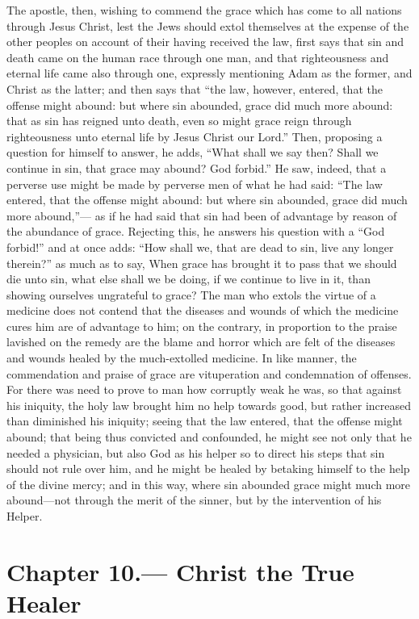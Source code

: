 \documentclass[10pt, twocolumn, oneside, a4paper]{memoir}
\newcommand{\gloss}[1]{%
    \marginpar[\RaggedLeft \footnotesize{#1}]{\RaggedRight \footnotesize{#1}}}
\begin{document}
The apostle, then, wishing to commend the grace which has come to all nations through Jesus Christ, lest the Jews should extol themselves at the expense of the other peoples on account of their having received the law, first says that sin and death came on the human race through one man, and that righteousness and eternal life came also through one, expressly mentioning Adam as the former, and Christ as the latter; and then says that ``the law, however, entered, that the offense might abound: but where sin abounded, grace did much more abound: that as sin has reigned unto death, even so might grace reign through righteousness unto eternal life by Jesus Christ our Lord.'' \gloss{Romans 5:20-21} Then, proposing a question for himself to answer, he adds, ``What shall we say then? Shall we continue in sin, that grace may abound? God forbid.''  He saw, indeed, that a perverse use might be made by perverse men of what he had said: ``The law entered, that the offense might abound: but where sin abounded, grace did much more abound,''— as if he had said that sin had been of advantage by reason of the abundance of grace. Rejecting this, he answers his question with a ``God forbid!'' and at once adds: ``How shall we, that are dead to sin, live any longer therein?'' \gloss{Romans 6:2} as much as to say, When grace has brought it to pass that we should die unto sin, what else shall we be doing, if we continue to live in it, than showing ourselves ungrateful to grace? The man who extols the virtue of a medicine does not contend that the diseases and wounds of which the medicine cures him are of advantage to him; on the contrary, in proportion to the praise lavished on the remedy are the blame and horror which are felt of the diseases and wounds healed by the much-extolled medicine. In like manner, the commendation and praise of grace are vituperation and condemnation of offenses. For there was need to prove to man how corruptly weak he was, so that against his iniquity, the holy law brought him no help towards good, but rather increased than diminished his iniquity; seeing that the law entered, that the offense might abound; that being thus convicted and confounded, he might see not only that he needed a physician, but also God as his helper so to direct his steps that sin should not rule over him, and he might be healed by betaking himself to the help of the divine mercy; and in this way, where sin abounded grace might much more abound—not through the merit of the sinner, but by the intervention of his Helper.
\section*{Chapter 10.— Christ the True Healer}
\end{document}
